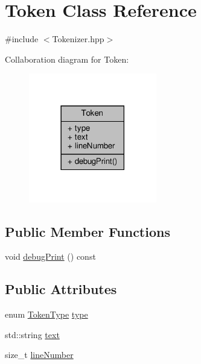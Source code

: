 \hypertarget{classft_1_1_token}{}\section{Token Class Reference}
\label{classft_1_1_token}


{\ttfamily \#include $<$Tokenizer.\+hpp$>$}



Collaboration diagram for Token\+:
\nopagebreak
\begin{figure}[H]
\begin{center}
\leavevmode
\includegraphics[width=158pt]{classft_1_1_token__coll__graph}
\end{center}
\end{figure}
\subsection*{Public Member Functions}
\begin{DoxyCompactItemize}
\item 
void \hyperlink{classft_1_1_token_ad5cb0ada03653eb2e1c8947f05c07ad6}{debug\+Print} () const
\end{DoxyCompactItemize}
\subsection*{Public Attributes}
\begin{DoxyCompactItemize}
\item 
enum \hyperlink{namespaceft_aa520fbf142ba1e7e659590c07da31921}{Token\+Type} \hyperlink{classft_1_1_token_a9ba17ef6e6c544012e04da10a6d461e5}{type}
\item 
std\+::string \hyperlink{classft_1_1_token_a23c058547fbc73b5659191844a9f258c}{text}
\item 
size\+\_\+t \hyperlink{classft_1_1_token_a996a051ecda6b841e4b58246536a7006}{line\+Number}
\end{DoxyCompactItemize}


